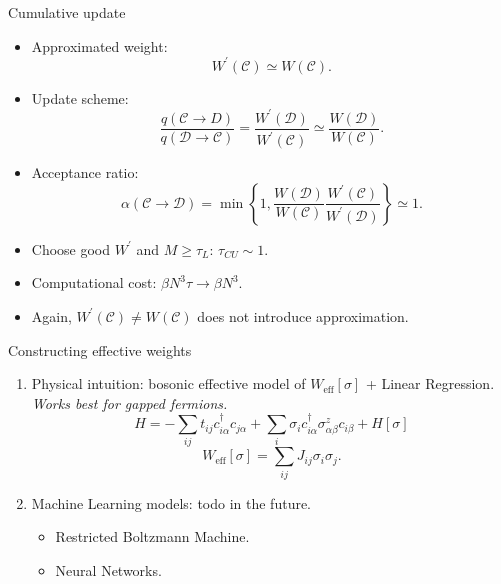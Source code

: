 \documentclass[xcolor=table, 10pt, aspectratio=43]{beamer}
\begin{document}
\begin{frame}{Cumulative update}
  \begin{itemize}
    \item Approximated weight:
    \[W^\prime(\mathcal C)\simeq W(\mathcal C).\]
    \item Update scheme:
    \[\frac{q(\mathcal C\rightarrow D)}
    {q(\mathcal D\rightarrow\mathcal C)}
    =\frac{W^\prime(\mathcal D)}{W^\prime(\mathcal C)}
    \simeq\frac{W(\mathcal D)}{W(\mathcal C)}.\]
    \item Acceptance ratio:
    \[\alpha(\mathcal C\rightarrow \mathcal D)=\min\left\{1, \frac{W(\mathcal D)}{W(\mathcal C)}
    \frac{W^\prime(\mathcal C)}{W^\prime(\mathcal D)}\right\}\simeq1.\]
    \item Choose good $W^\prime$ and $M\geq\tau_L$: $\tau_{CU}\sim1$.
    \item Computational cost: $\beta N^3\tau\rightarrow \beta N^3$.
    \item Again, $W^\prime(\mathcal C)\neq W(\mathcal C)$ does not introduce approximation.
  \end{itemize}
\end{frame}

\begin{frame}{Constructing effective weights}
\begin{enumerate}
  \item Physical intuition: bosonic effective model of $W_{\text{eff}}[\sigma]$
  + Linear Regression.\\
  \emph{Works best for gapped fermions.}
  \[H=-\sum_{ij}t_{ij}c_{i\alpha}^\dagger c_{j\alpha}
  +\sum_i\sigma_ic_{i\alpha}^\dagger\sigma^z_{\alpha\beta} c_{i\beta}
  +H[\sigma]\]
  \[W_{\text{eff}}[\sigma]=\sum_{ij}J_{ij}\sigma_i\sigma_j.\]
  \item Machine Learning models: todo in the future.
  \begin{itemize}
    \item Restricted Boltzmann Machine.
    \item Neural Networks.
  \end{itemize}
\end{enumerate}
\end{frame}
\end{document}
